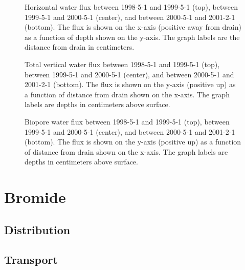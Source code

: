 \begin{figure}[htbp]
  \centering
  
  \caption{Horizontal water flux between 1998-5-1 and 1999-5-1 (top),
    between 1999-5-1 and 2000-5-1 (center), and between 2000-5-1 and
    2001-2-1 (bottom).  The flux is shown on the x-axis (positive away
    from drain) as a function of depth shown on the y-axis.  The graph
    labels are the distance from drain in centimeters.}
  \label{fig:Rorrende-water-horizontal}
\end{figure}

\begin{figure}[htbp]
  \centering
  
  \caption{Total vertical water flux between 1998-5-1 and
    1999-5-1 (top), between 1999-5-1 and 2000-5-1 (center), and
    between 2000-5-1 and 2001-2-1 (bottom).  The flux is shown on the
    y-axis (positive up) as a function of distance from drain shown on
    the x-axis.  The graph labels are depths in centimeters above
    surface.}
  \label{fig:Rorrende-water-vertical}
\end{figure}

\begin{figure}[htbp]
  \centering
  
  \caption{Biopore water flux between 1998-5-1 and 1999-5-1 (top),
    between 1999-5-1 and 2000-5-1 (center), and between 2000-5-1 and
    2001-2-1 (bottom).  The flux is shown on the y-axis (positive up)
    as a function of distance from drain shown on the x-axis.  The
    graph labels are depths in centimeters above surface.}
  \label{fig:Rorrende-water-biopore}
\end{figure}

\FloatBarrier
\section{Bromide}

\subsection{Distribution}

\subsection{Transport}

